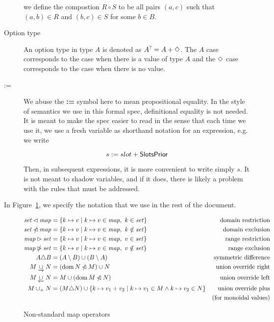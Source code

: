 \begin{description}
    we define the compostion $R\circ S$ to be all pairs $(a, c)$ such that
    $(a, b)\in R$ and $(b, c)\in S$ for some $b\in B$.
  \item[Option type] An option type in type $A$ is denoted as $A^? = A + \Diamond$. The
    $A$ case corresponds to the case when there is a value of type $A$ and the $\Diamond$
    case corresponds to the case when there is no value.
  \item[:=] We abuse the \textbf{:=} symbol here to mean propositional equality. In the
  style of semantics we use in this formal spec, definitional equality is not needed.
  It is meant to make the spec easier to read in the sense that each time we use it,
  we use a fresh variable as shorthand notation for an expression, e.g. we write

  \[s := slot + \mathsf{SlotsPrior}\]

  Then, in subsequent expressions, it is more convenient to write simply $s$.
  It is not meant to shadow variables, and if it does, there is likely a problem with the
  rules that must be addressed.
\end{description}


In Figure~\ref{fig:notation:nonstandard}, we specify the notation that we use in
the rest of the document.

\begin{figure}[htb]
  \begin{align*}
    \mathit{set} \lhd \mathit{map}
    & = \{ k \mapsto v \mid k \mapsto v \in \mathit{map}, ~ k \in \mathit{set} \}
    & \text{domain restriction}
    \\
    \mathit{set} \mathbin{\slashed{\lhd}} \mathit{map}
    & = \{ k \mapsto v \mid k \mapsto v \in \mathit{map}, ~ k \notin \mathit{set} \}
    & \text{domain exclusion}
    \\
    \mathit{map} \rhd \mathit{set}
    & = \{ k \mapsto v \mid k \mapsto v \in \mathit{map}, ~ v \in \mathit{set} \}
    & \text{range restriction}
    \\
    \mathit{map} \mathbin{\slashed{\rhd}} \mathit{set}
    & = \{ k \mapsto v \mid k \mapsto v \in \mathit{map}, ~ v \notin \mathit{set} \}
    & \text{range exclusion}
    \\
    A \triangle B
    & = (A \setminus B) \cup (B \setminus A)
    & \text{symmetric difference}
    \\
    M \mathbin{\underrightarrow\cup} N
    & = (\operatorname{dom} N \mathbin{\slashed{\lhd}} M)\cup N
    & \text{union override right}
    \\
    M \mathbin{\underleftarrow\cup} N
    & = M \cup (\operatorname{dom} M \mathbin{\slashed{\lhd}} N)
    & \text{union override left}
    \\
    M \mathbin{\cup_{+}} N
    & = (M \triangle N)
    \cup \{k\mapsto v_1+v_2\mid {k\mapsto v_1}\in M \land {k\mapsto v_2}\in N \}
    & \text{union override plus} \\
    & & \text{(for monoidal values)}\\
  \end{align*}
  \caption{Non-standard map operators}
  \label{fig:notation:nonstandard}
\end{figure}

\clearpage
